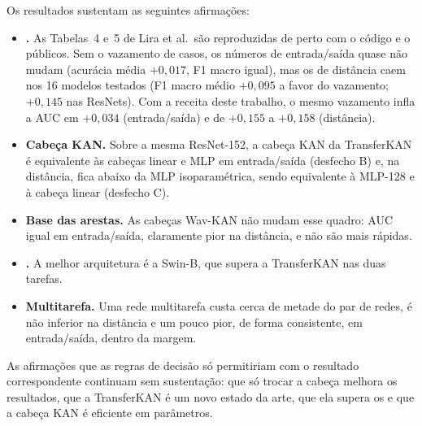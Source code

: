 Os resultados sustentam as seguintes afirmações:
\begin{itemize}
    \item \textbf{.} As Tabelas~4 e~5 de Lira et al.\ são reproduzidas de perto com o código e o  públicos. Sem o vazamento de casos, os números de entrada/saída quase não mudam (acurácia média $+0{,}017$, F1 macro igual), mas os de distância caem nos 16 modelos testados (F1 macro médio $+0{,}095$ a favor do vazamento; $+0{,}145$ nas ResNets). Com a receita deste trabalho, o mesmo vazamento infla a AUC em $+0{,}034$ (entrada/saída) e de $+0{,}155$ a $+0{,}158$ (distância).
    \item \textbf{Cabeça KAN.} Sobre a mesma ResNet-152, a cabeça KAN da TransferKAN é equivalente às cabeças linear e MLP em entrada/saída (desfecho B) e, na distância, fica abaixo da MLP isoparamétrica, sendo equivalente à MLP-128 e à cabeça linear (desfecho C).
    \item \textbf{Base das arestas.} As cabeças Wav-KAN não mudam esse quadro: AUC igual em entrada/saída, claramente pior na distância, e não são mais rápidas.
    \item \textbf{.} A melhor arquitetura é a Swin-B, que supera a TransferKAN nas duas tarefas.
    \item \textbf{Multitarefa.} Uma rede multitarefa custa cerca de metade do par de redes, é não inferior na distância e um pouco pior, de forma consistente, em entrada/saída, dentro da margem.
\end{itemize}
As afirmações que as regras de decisão só permitiriam com o resultado correspondente continuam sem sustentação: que só trocar a cabeça melhora os resultados, que a TransferKAN é um novo estado da arte, que ela supera os  e que a cabeça KAN é eficiente em parâmetros.
